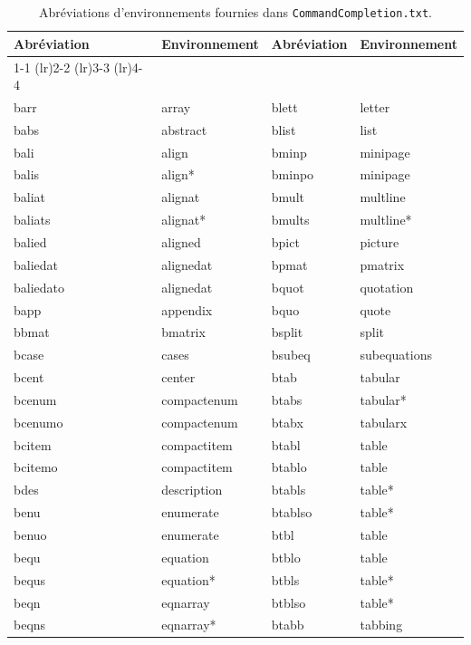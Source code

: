 \documentclass[11pt]{article}
\newcommand{\CCT}{\texttt{CommandCompletion.txt}}
\begin{document}
\begin{table}[!h]
\small
\centering
\caption{Abréviations d’environnements fournies dans \CCT.}
\label{tbl:environments}
\vspace{10pt}
\begin{tabular}{llll}
\textbf{Abréviation} & \textbf{Environnement} & \textbf{Abréviation} & \textbf{Environnement} \\
\cmidrule[0.5pt](lr){1-1} \cmidrule[0.5pt](lr){2-2} \cmidrule[0.5pt](lr){3-3} \cmidrule[0.5pt](lr){4-4}\\
barr      & array       & blett   & letter \\
babs      & abstract    & blist   & list \\
bali      & align       & bminp   & minipage \\
balis     & align*      & bminpo  & minipage \\
baliat    & alignat     & bmult   & multline \\
baliats   & alignat*    & bmults  & multline* \\
balied    & aligned     & bpict   & picture \\
baliedat  & alignedat   & bpmat   & pmatrix \\
baliedato & alignedat   & bquot   & quotation \\
bapp      & appendix    & bquo    & quote \\
bbmat     & bmatrix     & bsplit  & split \\
bcase     & cases       & bsubeq  & subequations \\
bcent     & center      & btab    & tabular \\
bcenum    & compactenum & btabs   & tabular* \\
bcenumo   & compactenum & btabx   & tabularx \\
bcitem    & compactitem & btabl   & table \\
bcitemo   & compactitem & btablo  & table \\
bdes      & description & btabls  & table* \\
benu      & enumerate   & btablso & table* \\
benuo     & enumerate   & btbl    & table \\
bequ      & equation    & btblo   & table \\
bequs     & equation*   & btbls   & table* \\
beqn      & eqnarray    & btblso  & table* \\
beqns     & eqnarray*   & btabb   & tabbing \\

\end{tabular}
\end{table}
\end{document}
